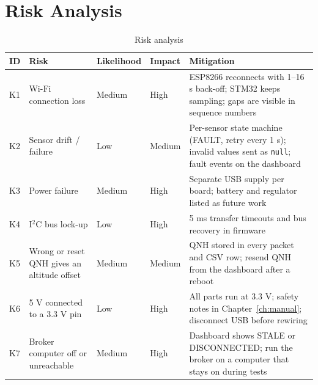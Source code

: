 \documentclass[12pt,a4paper]{report}
\begin{document}
\section{Risk Analysis}
\begin{table}[htbp]
\centering
\caption{Risk analysis}
\label{tab:risk}
\small
\begin{tabularx}{\textwidth}{lXllX}
\toprule
\textbf{ID} & \textbf{Risk} & \textbf{Likelihood} & \textbf{Impact} & \textbf{Mitigation}\\
\midrule
K1 & Wi-Fi connection loss & Medium & High & ESP8266 reconnects with 1--16 s back-off; STM32 keeps sampling; gaps are visible in sequence numbers\\
K2 & Sensor drift / failure & Low & Medium & Per-sensor state machine (FAULT, retry every 1 s); invalid values sent as \texttt{null}; fault events on the dashboard\\
K3 & Power failure & Medium & High & Separate USB supply per board; battery and regulator listed as future work\\
K4 & I$^2$C bus lock-up & Low & High & 5 ms transfer timeouts and bus recovery in firmware\\
K5 & Wrong or reset QNH gives an altitude offset & Medium & Medium & QNH stored in every packet and CSV row; resend QNH from the dashboard after a reboot\\
K6 & 5 V connected to a 3.3 V pin & Low & High & All parts run at 3.3 V; safety notes in Chapter~\ref{ch:manual}; disconnect USB before rewiring\\
K7 & Broker computer off or unreachable & Medium & High & Dashboard shows STALE or DISCONNECTED; run the broker on a computer that stays on during tests\\
\bottomrule
\end{tabularx}
\end{table}
\end{document}
